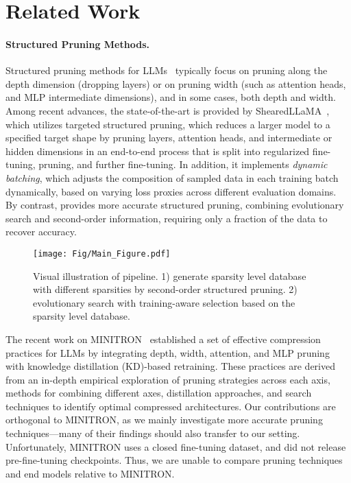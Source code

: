 \vspace{-1.5em}
\section{Related Work}
\paragraph{Structured Pruning Methods.} 
Structured pruning methods for LLMs~\cite{wang2020structured,ma2023llmpruner,xia2023sheared,kurtic2024ziplm,men2024shortgpt,kim2024shortened,an2024fluctuation,muralidharan2024compact} typically focus on pruning along the depth dimension (dropping layers) or on pruning width (such as attention heads, and MLP intermediate dimensions), and in some cases, both depth and width. Among recent advances, the state-of-the-art is provided by 
ShearedLLaMA~\cite{xia2023sheared}, which utilizes targeted structured pruning, which reduces a larger model to a specified target shape by pruning layers, attention heads, and intermediate or hidden dimensions in an end-to-end process that is split into regularized fine-tuning, pruning, and further fine-tuning. In addition, it implements \emph{dynamic batching}, which adjusts the composition of sampled data in each training batch dynamically, based on varying loss proxies across different evaluation domains. 
By contrast, \sysname{} provides more accurate structured pruning, combining evolutionary search and second-order information, requiring only a fraction of the data to recover accuracy. 

\begin{figure*}[t]
    \centering
    \texttt{[image: Fig/Main\_Figure.pdf]}
    \vspace{-0.1in}
    \caption{Visual illustration of \sysname pipeline.  1) generate sparsity level database with different sparsities by second-order structured pruning. 2) evolutionary search with training-aware selection based on the sparsity level database.   }
    \label{fig:main_fig}
    \vspace{-0.13in}
\end{figure*}

The recent work on MINITRON~\cite{muralidharan2024compact} established a set of effective compression practices for LLMs by integrating depth, width, attention, and MLP pruning with knowledge distillation (KD)-based retraining. These practices are derived from an in-depth empirical exploration of pruning strategies across each axis, methods for combining different axes, distillation approaches, and search techniques to identify optimal compressed architectures. 
Our contributions are orthogonal to MINITRON, as we mainly investigate more accurate pruning techniques---many of their findings should also transfer to our setting.  
Unfortunately, MINITRON uses a closed fine-tuning dataset, and did not release pre-fine-tuning checkpoints. Thus, we are unable to compare pruning techniques and end models relative to MINITRON.  

